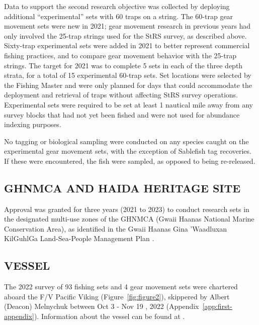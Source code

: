 \documentclass[12pt]{article}\usepackage[]{graphicx}\usepackage[]{color}
\begin{document}
Data to support the second research objective was collected by deploying additional ``experimental'' sets with 60 traps on a string. The 60-trap gear movement sets were new in 2021; gear movement research in previous years had only involved the 25-trap strings used for the StRS survey, as described above. Sixty-trap experimental sets were added in 2021 to better represent commercial fishing practices, and to compare gear movement behavior with the 25-trap strings. The target for 2021 was to complete 5 sets in each of the three depth strata, for a total of 15 experimental 60-trap sets. Set locations were selected by the Fishing Master and were only planned for days that could accommodate the deployment and retrieval of traps without affecting StRS survey operations. Experimental sets were required to be set at least 1 nautical mile away from any survey blocks that had not yet been fished and were not used for abundance indexing purposes.

No tagging or biological sampling were conducted on any species caught on the experimental gear movement sets, with the exception of Sablefish tag recoveries. If these were encountered, the fish were sampled, as opposed to being re-released.

\hypertarget{ghnmca-and-haida-heritage-site}{%
\subsection{GHNMCA AND HAIDA HERITAGE SITE}\label{ghnmca-and-haida-heritage-site}}

Approval was granted for three years (2021 to 2023) to conduct research sets in the designated multi-use zones of the GHNMCA (Gwaii Haanas National Marine Conservation Area), as identified in the Gwaii Haanas Gina 'Waadluxan KilGuhlGa Land-Sea-People Management Plan .

\hypertarget{vessel}{%
\subsection{VESSEL}\label{vessel}}

The 2022 survey of 93 fishing sets and 4 gear movement sets were chartered aboard the F/V Pacific Viking (Figure~\ref{fig:figure2}), skippered by Albert (Deacon) Melnychuk between Oct 3 - Nov 19 , 2022 (Appendix~\ref{app:first-appendix}). Information about the vessel can be found at .
\end{document}
